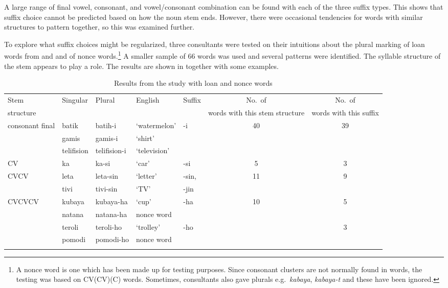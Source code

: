 \documentclass[output=paper]{langsci/langscibook}
\begin{document}
A large range of final vowel, consonant, and vowel/consonant combination can be found with each of the three suffix types. This shows that suffix choice cannot be predicted based on how the noun stem ends. However, there were occasional tendencies for words with similar structures to pattern together, so this was examined further.

To explore what suffix choices might be regularized, three consultants were tested on their intuitions about the plural marking of loan words from  and  and of nonce words.\footnote{A nonce word is one which has been made up for testing purposes. Since consonant clusters are not normally found in  words, the testing was based on CV(CV)(C) words. Sometimes, consultants also gave  plurals e.g.\ \textit{kabaya}, \textit{kabaya-t} and these have been ignored.} A smaller sample of 66 words was used and several patterns were identified. The syllable structure of the stem appears to play a role. The results are shown in  together with some examples.

\begin{table}
\begin{tabularx}{\textwidth}{XllXlSS}
\lsptoprule

\small {Stem} & \small {Singular} & \small {Plural} & \small {English} & \small {Suffix} & \small {No.\ of}  & \small {No.\ of} \\ [-.15em]
\small {structure} & & & & & \small {words with this stem structure} & \small {words with this suffix} \\ 
\midrule
 consonant final &  batik &  batih-i &  `water\-melon' &  -i &  40 &  39\\
\tablevspace
&  gamis &  gamis-i &  ‘shirt’ &  &  & \\
\tablevspace
&  telifision &  telifision-i &  ‘television’ &  &  & \\
\midrule
 CV &  ka &  ka-si &  ‘car’ &  -si &  5 &  3\\
\midrule
 CVCV &  leta &  leta-sin &  ‘letter’ & { -sin,}
 &  11 &  9\\
\tablevspace
&  tivi &  tivi-sin &  ‘TV’ &   -jin &  & \\
\midrule
 CVCVCV &  kubaya &  kubaya-ha &  ‘cup’ &  -ha &  10 &  5\\
&  natana &  natana-ha &  nonce word &  &  & \\
\tablevspace
&  teroli &  teroli-ho &  ‘trolley’ &  -ho &  &  3\\
\tablevspace
&  pomodi &  pomodi-ho &  nonce word &  &  & \\
\lspbottomrule
\end{tabularx}
\caption{Results from the study with loan and nonce words}
\label{tab:moodie:13}
\end{table}
\end{document}
